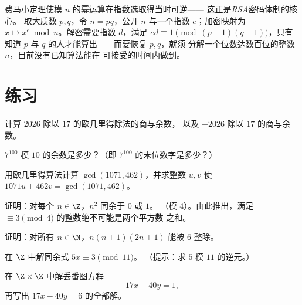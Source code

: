 \begin{example}[密码学应用]\label{ex:g12:arith:rsa}
费马小定理使模 $n$ 的幂运算在指数选取得当时可逆——
这正是\emph{RSA}密码体制的核心。
取大质数 $p, q$，令 $n = pq$，公开 $n$ 与一个指数
$e$；加密映射为 $x \mapsto x^e \bmod n$。解密需要指数
$d$，满足 $ed \equiv 1 \pmod{(p-1)(q-1)}$，只有知道 $p$
与 $q$ 的人才能算出——而要恢复 $p, q$，就须
分解一个位数达数百位的整数 $n$，目前没有已知算法能在
可接受的时间内做到。
\end{example}

\section{练习}

\begin{exercise}[$\star$]\label{exo:g12:arith:1}
计算 $2026$ 除以 $17$ 的欧几里得除法的商与余数，
以及 $-2026$ 除以 $17$ 的商与余数。
\end{exercise}

\begin{exercise}[$\star$]\label{exo:g12:arith:2}
$7^{100}$ 模 $10$ 的余数是多少？（即
$7^{100}$ 的末位数字是多少？）
\end{exercise}

\begin{exercise}[$\star$]\label{exo:g12:arith:3}
用欧几里得算法计算 $\gcd(1071, 462)$，并求整数
$u, v$ 使 $1071u + 462v = \gcd(1071, 462)$。
\end{exercise}

\begin{exercise}[$\star$]\label{exo:g12:arith:4}
证明：对每个 $n \in \Z$，$n^2$ 同余于 $0$ 或 $1$。
（模 $4$）。由此推出，满足 $\equiv 3 \pmod 4$ 的整数绝不可能是两个平方数
之和。
\end{exercise}

\begin{exercise}[$\star\star$]\label{exo:g12:arith:5}
证明：对所有 $n \in \N$，$n(n+1)(2n+1)$ 能被 $6$ 整除。
\end{exercise}

\begin{exercise}[$\star\star$]\label{exo:g12:arith:6}
在 $\Z$ 中解同余式 $5x \equiv 3 \pmod{11}$。
（提示：求 $5$ 模 $11$ 的逆元。）
\end{exercise}

\begin{exercise}[$\star\star$]\label{exo:g12:arith:7}
在 $\Z \times \Z$ 中解丢番图方程
\[
17x - 40y = 1,
\]
再写出 $17x - 40y = 6$ 的全部解。
\end{exercise}

